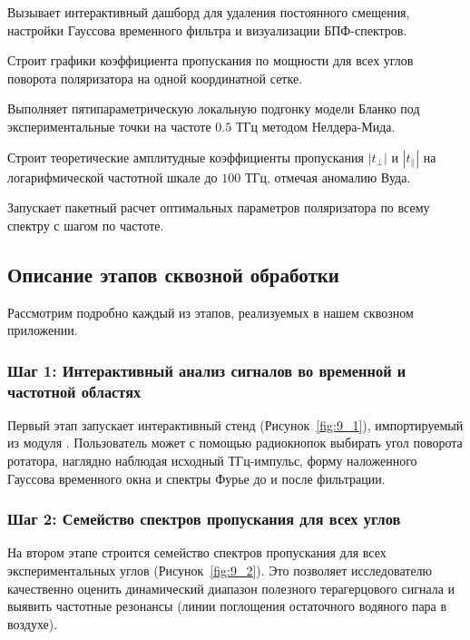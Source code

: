 \begin{syntaxdesc}
    \item[Интерактивный анализ \mycode{plots.main_interactive()}] Вызывает интерактивный дашборд для удаления постоянного смещения, настройки Гауссова временного фильтра и визуализации БПФ-спектров.
    \item[Семейство спектров \mycode{plots.plot_all_transmissions()}] Строит графики коэффициента пропускания по мощности для всех углов поворота поляризатора на одной координатной сетке.
    \item[Локальная оптимизация \mycode{run_single_frequency_fit}] Выполняет пятипараметрическую локальную подгонку модели Бланко под экспериментальные точки на частоте $0.5$ ТГц методом Нелдера-Мида.
    \item[Теоретические характеристики \mycode{plots.plot_polarizer_theory_characteristics()}] Строит теоретические амплитудные коэффициенты пропускания $|t_\perp|$ и $|t_\parallel|$ на логарифмической частотной шкале до $100$ ТГц, отмечая аномалию Вуда.
    \item[Пакетная оптимизация \mycode{frequency_analysis.analyze_polarizer_over_spectrum()}] Запускает пакетный расчет оптимальных параметров поляризатора по всему спектру с шагом по частоте.
\end{syntaxdesc}

\subsection{Описание этапов сквозной обработки}

Рассмотрим подробно каждый из этапов, реализуемых в нашем сквозном приложении.

\subsubsection{Шаг 1: Интерактивный анализ сигналов во временной и частотной областях}
Первый этап запускает интерактивный стенд (Рисунок~\ref{fig:9_1}), импортируемый из модуля . Пользователь может с помощью радиокнопок выбирать угол поворота ротатора, наглядно наблюдая исходный ТГц-импульс, форму наложенного Гауссова временного окна и спектры Фурье до и после фильтрации.


\subsubsection{Шаг 2: Семейство спектров пропускания для всех углов}
На втором этапе строится семейство спектров пропускания для всех экспериментальных углов (Рисунок~\ref{fig:9_2}). Это позволяет исследователю качественно оценить динамический диапазон полезного терагерцового сигнала и выявить частотные резонансы (линии поглощения остаточного водяного пара в воздухе).

